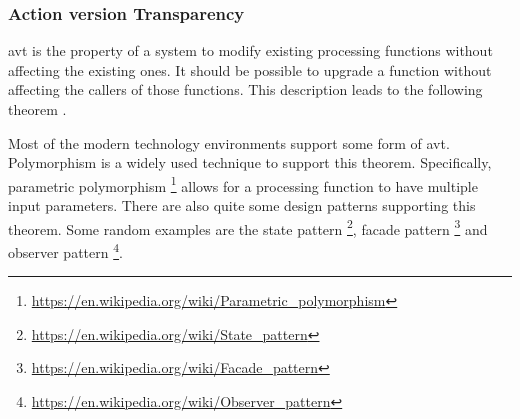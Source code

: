 \subsubsection{Action version Transparency}
\gls{avt} is the property of a system to modify existing processing functions without
affecting the existing ones. It should be possible to upgrade a function without affecting
the callers of those functions. This description leads to the following theorem
\parencite[282]{mannaert_normalized_2016}.


Most of the modern technology environments support some form of \gls{avt}. Polymorphism is
a widely used technique to support this theorem. Specifically, parametric
polymorphism \footnote{\url{https://en.wikipedia.org/wiki/Parametric_polymorphism}} allows
for a processing function to have multiple input parameters. There are also quite some
design patterns supporting this theorem. Some random examples are the state pattern
\footnote{\url{https://en.wikipedia.org/wiki/State_pattern}}, facade pattern
\footnote{\url{https://en.wikipedia.org/wiki/Facade_pattern}} and observer pattern
\footnote{\url{https://en.wikipedia.org/wiki/Observer_pattern}}.